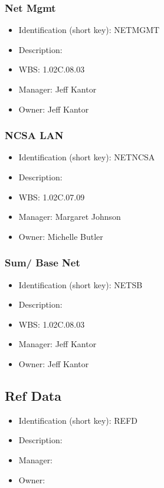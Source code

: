 \subsubsection{Net Mgmt}\label{sect:NETMGMT}
\begin{itemize}
\item Identification (short key): NETMGMT
\item Description: 
\item WBS: 1.02C.08.03
\item Manager: Jeff Kantor
\item Owner: Jeff Kantor
\end{itemize}

\subsubsection{NCSA LAN}\label{sect:NETNCSA}
\begin{itemize}
\item Identification (short key): NETNCSA
\item Description: 
\item WBS: 1.02C.07.09
\item Manager: Margaret Johnson
\item Owner: Michelle Butler
\end{itemize}

\subsubsection{Sum/ Base Net}\label{sect:NETSB}
\begin{itemize}
\item Identification (short key): NETSB
\item Description: 
\item WBS: 1.02C.08.03
\item Manager: Jeff Kantor
\item Owner: Jeff Kantor
\end{itemize}

\subsection{Ref Data}\label{sect:REFD}
\begin{itemize}
\item Identification (short key): REFD
\item Description: 
\item Manager: 
\item Owner: 
\end{itemize}

